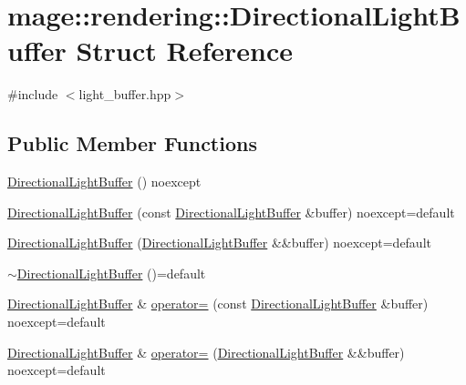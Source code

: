 \hypertarget{structmage_1_1rendering_1_1_directional_light_buffer}{}\section{mage\+:\+:rendering\+:\+:Directional\+Light\+Buffer Struct Reference}
\label{structmage_1_1rendering_1_1_directional_light_buffer}


{\ttfamily \#include $<$light\+\_\+buffer.\+hpp$>$}

\subsection*{Public Member Functions}
\begin{DoxyCompactItemize}
\item 
\hyperlink{structmage_1_1rendering_1_1_directional_light_buffer_a618dbd63423f0f008ef18c5e5a7fe560}{Directional\+Light\+Buffer} () noexcept
\item 
\hyperlink{structmage_1_1rendering_1_1_directional_light_buffer_a8bd677130e2bc44b721935396f3ee9ac}{Directional\+Light\+Buffer} (const \hyperlink{structmage_1_1rendering_1_1_directional_light_buffer}{Directional\+Light\+Buffer} \&buffer) noexcept=default
\item 
\hyperlink{structmage_1_1rendering_1_1_directional_light_buffer_a2db095d74145a02eb6c6c306501b04e8}{Directional\+Light\+Buffer} (\hyperlink{structmage_1_1rendering_1_1_directional_light_buffer}{Directional\+Light\+Buffer} \&\&buffer) noexcept=default
\item 
\hyperlink{structmage_1_1rendering_1_1_directional_light_buffer_ac52791a07948b17670c13b4aa0ddb104}{$\sim$\+Directional\+Light\+Buffer} ()=default
\item 
\hyperlink{structmage_1_1rendering_1_1_directional_light_buffer}{Directional\+Light\+Buffer} \& \hyperlink{structmage_1_1rendering_1_1_directional_light_buffer_ae2dfc882b678be7ae81b6d51b55f74bc}{operator=} (const \hyperlink{structmage_1_1rendering_1_1_directional_light_buffer}{Directional\+Light\+Buffer} \&buffer) noexcept=default
\item 
\hyperlink{structmage_1_1rendering_1_1_directional_light_buffer}{Directional\+Light\+Buffer} \& \hyperlink{structmage_1_1rendering_1_1_directional_light_buffer_adb98ba5e4772ab90af749e521a6a6593}{operator=} (\hyperlink{structmage_1_1rendering_1_1_directional_light_buffer}{Directional\+Light\+Buffer} \&\&buffer) noexcept=default
\end{DoxyCompactItemize}

